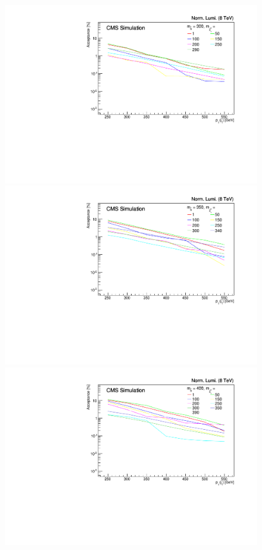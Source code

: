 \begin{figure}[ht!]
\begin{center}
  \includegraphics[scale=0.35]{Figures/sus13009/limitplots/plots/sbottom/acceptance_300.pdf} 
  \includegraphics[scale=0.35]{Figures/sus13009/limitplots/plots/sbottom/acceptance_350.pdf} 
  \includegraphics[scale=0.35]{Figures/sus13009/limitplots/plots/sbottom/acceptance_400.pdf}     

\end{center}
\end{figure}
